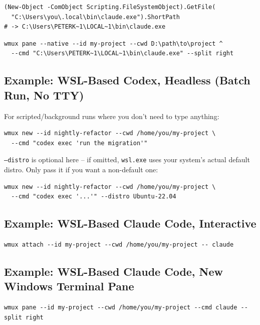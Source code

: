 \documentclass{article}
\begin{document}
\begin{lstlisting}
(New-Object -ComObject Scripting.FileSystemObject).GetFile(
  "C:\Users\you\.local\bin\claude.exe").ShortPath
# -> C:\Users\PETERK~1\LOCAL~1\bin\claude.exe
\end{lstlisting}

\begin{lstlisting}
wmux pane --native --id my-project --cwd D:\path\to\project ^
  --cmd "C:\Users\PETERK~1\LOCAL~1\bin\claude.exe" --split right
\end{lstlisting}

\subsection{Example: WSL-Based Codex, Headless (Batch Run, No TTY)}

For scripted/background runs where you don't need to type anything:

\begin{lstlisting}
wmux new --id nightly-refactor --cwd /home/you/my-project \
  --cmd "codex exec 'run the migration'"
\end{lstlisting}

\texttt{--distro} is optional here -- if omitted, \texttt{wsl.exe} uses your system's actual default distro. Only pass it if you want a non-default one:

\begin{lstlisting}
wmux new --id nightly-refactor --cwd /home/you/my-project \
  --cmd "codex exec '...'" --distro Ubuntu-22.04
\end{lstlisting}

\subsection{Example: WSL-Based Claude Code, Interactive}

\begin{lstlisting}
wmux attach --id my-project --cwd /home/you/my-project -- claude
\end{lstlisting}

\subsection{Example: WSL-Based Claude Code, New Windows Terminal Pane}

\begin{lstlisting}
wmux pane --id my-project --cwd /home/you/my-project --cmd claude --split right
\end{lstlisting}
\end{document}
